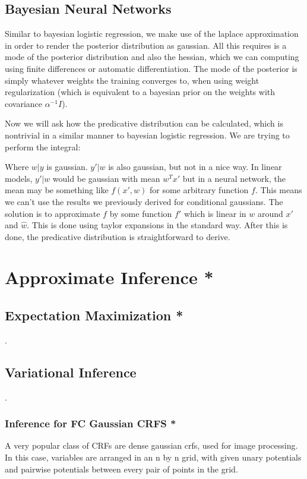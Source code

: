 \documentclass[12pt]{article}
\begin{document}
\subsection{Bayesian Neural Networks}

Similar to bayesian logistic regression, we make use of the laplace approximation in order to render the posterior distribution as gaussian. All this requires is a mode of the posterior distribution and also the hessian, which we can computing using finite differences or automatic differentiation. The mode of the posterior is simply whatever weights the training converges to, when using weight regularization (which is equivalent to a bayesian prior on the weights with covariance $\alpha^{-1} I$). 

Now we will ask how the predicative distribution can be calculated, which is nontrivial in a similar manner to bayesian logistic regression. We are trying to perform the integral:


Where $w|y$ is gaussian. $y'|w$ is also gaussian, but not in a nice way. In linear models, $y'|w$ would be gaussian with mean $w^T x'$ but in a neural network, the mean may be something like $f(x',w)$ for some arbitrary function $f$. This means we can't use the results we previously derived for conditional gaussians. The solution is to approximate $f$ by some function $f'$ which is linear in $w$ around $x'$ and $\hat w$. This is done using taylor expansions in the standard way. After this is done, the predicative distribution is straightforward to derive.

\section{Approximate Inference *}

\subsection{Expectation Maximization *}
.
\subsection{Variational Inference}
.
\subsubsection{Inference for FC Gaussian CRFS *}

A very popular class of CRFs are dense gaussian crfs, used for image processing. In this case, variables are arranged in an n by n grid, with given unary potentials and pairwise potentials between every pair of points in the grid.
\end{document}
